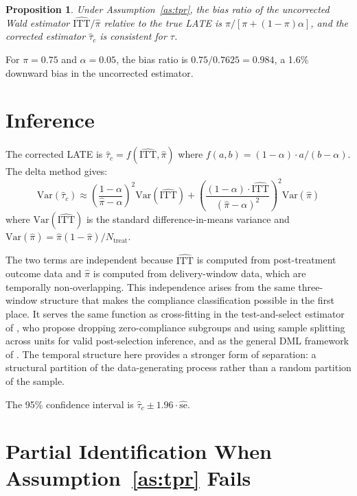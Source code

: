 \documentclass[12pt]{article}
\newtheorem{proposition}{Proposition}
\begin{document}
\begin{proposition}\label{prop:bias}
Under Assumption~\ref{as:tpr}, the bias ratio of the uncorrected Wald estimator $\widehat{\text{ITT}}/\hat{\pi}$ relative to the true LATE is $\pi / [\pi + (1-\pi)\alpha]$, and the corrected estimator $\hat{\tau}_c$ is consistent for $\tau$.
\end{proposition}

\noindent For $\pi = 0.75$ and $\alpha = 0.05$, the bias ratio is $0.75 / 0.7625 = 0.984$, a 1.6\% downward bias in the uncorrected estimator.

\section{Inference}

The corrected LATE is $\hat{\tau}_c = f(\widehat{\text{ITT}}, \hat{\pi})$ where $f(a, b) = (1-\alpha) \cdot a / (b - \alpha)$. The delta method gives:
\begin{equation}\label{eq:var}
\text{Var}(\hat{\tau}_c) \approx \left(\frac{1-\alpha}{\hat{\pi}-\alpha}\right)^{\!2} \text{Var}(\widehat{\text{ITT}}) + \left(\frac{(1-\alpha) \cdot \widehat{\text{ITT}}}{(\hat{\pi}-\alpha)^2}\right)^{\!2} \text{Var}(\hat{\pi})
\end{equation}
where $\text{Var}(\widehat{\text{ITT}})$ is the standard difference-in-means variance and $\text{Var}(\hat{\pi}) = \hat{\pi}(1-\hat{\pi})/N_{\text{treat}}$.

The two terms are independent because $\widehat{\text{ITT}}$ is computed from post-treatment outcome data and $\hat{\pi}$ is computed from delivery-window data, which are temporally non-overlapping. This independence arises from the same three-window structure that makes the compliance classification possible in the first place. It serves the same function as cross-fitting in the test-and-select estimator of \citet{hazard2023}, who propose dropping zero-compliance subgroups and using sample splitting across units for valid post-selection inference, and as the general DML framework of \citet{chernozhukov2018}. The temporal structure here provides a stronger form of separation: a structural partition of the data-generating process rather than a random partition of the sample.

The 95\% confidence interval is $\hat{\tau}_c \pm 1.96 \cdot \hat{\text{se}}$.

\section{Partial Identification When Assumption~\ref{as:tpr} Fails}
\end{document}
